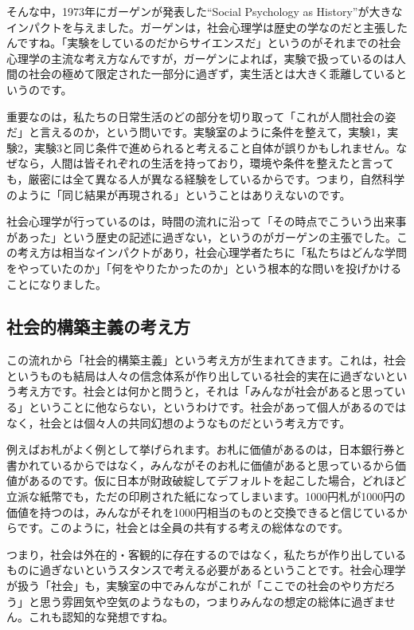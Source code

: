 \documentclass{ltjsbook}
\begin{document}
そんな中，1973年にガーゲンが発表した``Social Psychology as History''が大きなインパクトを与えました。ガーゲンは，社会心理学は歴史の学なのだと主張したんですね。「実験をしているのだからサイエンスだ」というのがそれまでの社会心理学の主流な考え方なんですが，ガーゲンによれば，実験で扱っているのは人間の社会の極めて限定された一部分に過ぎず，実生活とは大きく乖離しているというのです。

重要なのは，私たちの日常生活のどの部分を切り取って「これが人間社会の姿だ」と言えるのか，という問いです。実験室のように条件を整えて，実験1，実験2，実験3と同じ条件で進められると考えること自体が誤りかもしれません。なぜなら，人間は皆それぞれの生活を持っており，環境や条件を整えたと言っても，厳密には全て異なる人が異なる経験をしているからです。つまり，自然科学のように「同じ結果が再現される」ということはありえないのです。

社会心理学が行っているのは，時間の流れに沿って「その時点でこういう出来事があった」という歴史の記述に過ぎない，というのがガーゲンの主張でした。この考え方は相当なインパクトがあり，社会心理学者たちに「私たちはどんな学問をやっていたのか」「何をやりたかったのか」という根本的な問いを投げかけることになりました。

\subsection{社会的構築主義の考え方}
この流れから「社会的構築主義」という考え方が生まれてきます。これは，社会というものも結局は人々の信念体系が作り出している社会的実在に過ぎないという考え方です。社会とは何かと問うと，それは「みんなが社会があると思っている」ということに他ならない，というわけです。社会があって個人があるのではなく，社会とは個々人の共同幻想のようなものだという考え方です。

例えばお札がよく例として挙げられます。お札に価値があるのは，日本銀行券と書かれているからではなく，みんながそのお札に価値があると思っているから価値があるのです。仮に日本が財政破綻してデフォルトを起こした場合，どれほど立派な紙幣でも，ただの印刷された紙になってしまいます。1000円札が1000円の価値を持つのは，みんながそれを1000円相当のものと交換できると信じているからです。このように，社会とは全員の共有する考えの総体なのです。

つまり，社会は外在的・客観的に存在するのではなく，私たちが作り出しているものに過ぎないというスタンスで考える必要があるということです。社会心理学が扱う「社会」も，実験室の中でみんながこれが「ここでの社会のやり方だろう」と思う雰囲気や空気のようなもの，つまりみんなの想定の総体に過ぎません。これも認知的な発想ですね。
\end{document}
